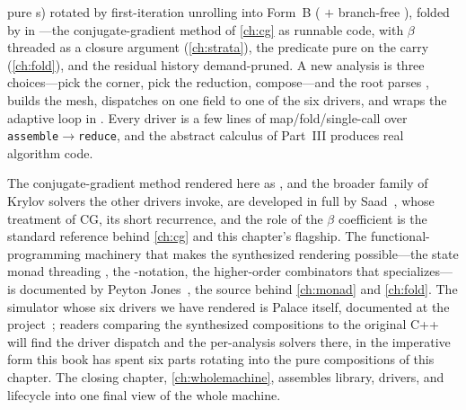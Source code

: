 pure s) rotated by first-iteration unrolling into Form~B
( $+$ branch-free ), folded by
 in ---the conjugate-gradient method of
\cref{ch:cg} as runnable code, with $\beta$ threaded as a closure argument
(\cref{ch:strata}), the predicate pure on the carry (\cref{ch:fold}), and the residual
history demand-pruned. A new analysis is three choices---pick the corner, pick the
reduction, compose---and the  root parses , builds the
mesh, dispatches on one field to one of the six drivers, and wraps the adaptive loop in
. Every driver is a few lines of map/fold/single-call over
\texttt{assemble}$\to$\texttt{reduce}, and the abstract calculus of Part~III produces
real algorithm code.

\furtherreading
The conjugate-gradient method rendered here as , and the broader family
of Krylov solvers the other drivers invoke, are developed in full by
Saad~\citep{saad2003}, whose treatment of CG, its short recurrence, and the role of the
$\beta$ coefficient is the standard reference behind \cref{ch:cg} and this chapter's
flagship. The functional-programming machinery that makes the synthesized rendering
possible---the state monad threading , the -notation, the
higher-order combinators that  specializes---is
documented by Peyton Jones~\citep{peytonjones2003}, the source behind \cref{ch:monad}
and \cref{ch:fold}. The simulator whose six drivers we have rendered is Palace itself,
documented at the project~\citep{palace2023}; readers comparing the synthesized
compositions to the original C++ will find the driver dispatch and the per-analysis
solvers there, in the imperative form this book has spent six parts rotating into the
pure compositions of this chapter. The closing chapter, \cref{ch:wholemachine},
assembles library, drivers, and lifecycle into one final view of the whole machine.


